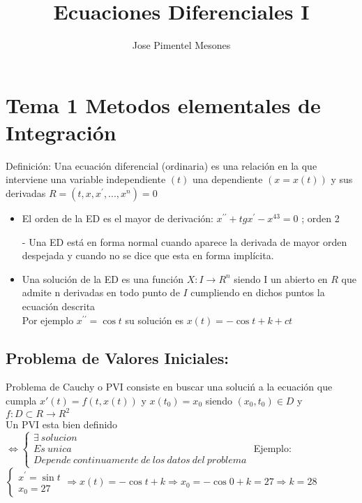 \documentclass[]{article}
\title{Ecuaciones Diferenciales I}
\author{Jose Pimentel Mesones}
\begin{document}
\maketitle

\begin{abstract}

\end{abstract}

\section{Tema 1 Metodos elementales de Integraci\'on}
Definición: Una ecuaci\'on diferencial (ordinaria) es una relación en la que interviene una variable independiente $(t)$ una dependiente $(x=x(t))$ y sus derivadas $R=(t,x,x^\prime,...,x^n)=0$\\
\begin{itemize}
	\item El orden de la ED es el mayor de derivaci\'on: $x^{\prime\prime}+tgx^\prime-x^{43}=0$ ; orden 2
	\item[-] Una ED est\'a en forma normal cuando aparece la derivada de mayor orden despejada y cuando no se dice que esta en forma impl\'icita.
	\item Una solución de la ED es una funci\'on $X:I\rightarrow R^n$ siendo I un abierto en $R$ que admite n derivadas en todo punto de $I$ cumpliendo en dichos puntos la ecuación descrita\\
	Por ejemplo $x^{\prime\prime}=\cos t$ su soluci\'on es $x(t)=-\cos t +k+ct$
\end{itemize} 
\subsection{Problema de Valores Iniciales:} Problema de Cauchy o PVI consiste en buscar una soluci\'n a la ecuaci\'on que cumpla $x\prime(t)=f(t,x(t))$ y $x(t_0)=x_0$ siendo $(x_0,t_0)\in D$ y $f:D\subset R\to R^2$\\
Un PVI esta bien definido $\Leftrightarrow  \left \{ \begin{array}{lccl}
\exists\ solucion\\ 
Es\ unica\\
Depende\ continuamente\ de\ los\ datos\ del\ problema
\end{array} \right.$
Ejemplo:  $\left \{ \begin{array}{lccl}
	x^\prime=\sin t\\
	x_0=27
\end{array} \right.\Rightarrow x(t)=-\cos t+k\Rightarrow x_0=-\cos 0+k=27\Rightarrow k=28	$
\end{document}
